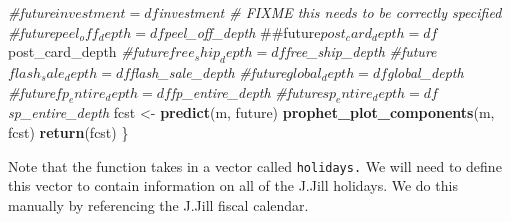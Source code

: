 \documentclass[]{article}
\newenvironment{Shaded}{\begin{snugshade}}{\end{snugshade}}
\newcommand{\KeywordTok}[1]{\textcolor[rgb]{0.13,0.29,0.53}{\textbf{{#1}}}}
\newcommand{\StringTok}[1]{\textcolor[rgb]{0.31,0.60,0.02}{{#1}}}
\newcommand{\CommentTok}[1]{\textcolor[rgb]{0.56,0.35,0.01}{\textit{{#1}}}}
\newcommand{\NormalTok}[1]{{#1}}
\begin{document}
\begin{Shaded}
\begin{Highlighting}[]
  \CommentTok{#future$investment = df$investment  # FIXME this needs to be correctly specified}
  \CommentTok{#future$peel_off_depth = df$peel_off_depth}
  \NormalTok{##future$post_card_depth = df$post_card_depth}
  \CommentTok{#future$free_ship_depth = df$free_ship_depth}
  \CommentTok{#future$flash_sale_depth = df$flash_sale_depth}
  \CommentTok{#future$global_depth = df$global_depth}
  \CommentTok{#future$fp_entire_depth = df$fp_entire_depth}
  \CommentTok{#future$sp_entire_depth = df$sp_entire_depth}
  \NormalTok{fcst <-}\StringTok{ }\KeywordTok{predict}\NormalTok{(m, future)}
  \KeywordTok{prophet_plot_components}\NormalTok{(m, fcst)}
  \KeywordTok{return}\NormalTok{(fcst)}
\NormalTok{\}}
\end{Highlighting}
\end{Shaded}

Note that the function takes in a vector called \texttt{holidays.} We
will need to define this vector to contain information on all of the
J.Jill holidays. We do this manually by referencing the J.Jill fiscal
calendar.
\end{document}
